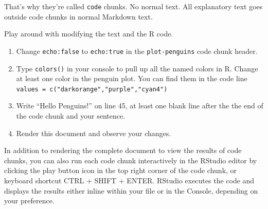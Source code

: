 \documentclass[
  letterpaper,
  DIV=11,
  numbers=noendperiod,
  oneside]{scrreprt}
\providecommand{\tightlist}{%
  \setlength{\itemsep}{0pt}\setlength{\parskip}{0pt}}\usepackage{longtable,booktabs,array}
\begin{document}
\begin{tcolorbox}[enhanced jigsaw, bottomrule=.15mm, colback=white, colframe=quarto-callout-important-color-frame, toprule=.15mm, coltitle=black, rightrule=.15mm, opacitybacktitle=0.6, colbacktitle=quarto-callout-important-color!10!white, toptitle=1mm, leftrule=.75mm, breakable, bottomtitle=1mm, titlerule=0mm, title=\textcolor{quarto-callout-important-color}{\faExclamation}\hspace{0.5em}{Only code goes in code chunks}, arc=.35mm, left=2mm, opacityback=0]

That's why they're called \texttt{code} chunks. No normal text. All
explanatory text goes outside code chunks in normal Markdown text.

\end{tcolorbox}

\begin{tcolorbox}[enhanced jigsaw, bottomrule=.15mm, colback=white, colframe=quarto-callout-tip-color-frame, toprule=.15mm, coltitle=black, rightrule=.15mm, opacitybacktitle=0.6, colbacktitle=quarto-callout-tip-color!10!white, toptitle=1mm, leftrule=.75mm, breakable, bottomtitle=1mm, titlerule=0mm, title={👉 Make a change}, arc=.35mm, left=2mm, opacityback=0]

Play around with modifying the text and the R code.

\begin{enumerate}
\def\labelenumi{\arabic{enumi}.}
\tightlist
\item
  Change \texttt{echo:false} to \texttt{echo:true} in the
  \texttt{plot-penguins} code chunk header.
\item
  Type \texttt{colors()} in your console to pull up all the named colors
  in R. Change at least one color in the penguin plot. You can find them
  in the code line \texttt{values\ =\ c("darkorange","purple","cyan4")}
\item
  Write ``Hello Penguins!'' on line 45, at least one blank line after
  the the end of the code chunk and your sentence.
\item
  Render this document and observe your changes.
\end{enumerate}

\end{tcolorbox}

In addition to rendering the complete document to view the results of
code chunks, you can also run each code chunk interactively in the
RStudio editor by clicking the play button icon in the top right corner
of the code chunk, or keyboard shortcut CTRL + SHIFT + ENTER. RStudio
executes the code and displays the results either inline within your
file or in the Console, depending on your preference.
\end{document}
